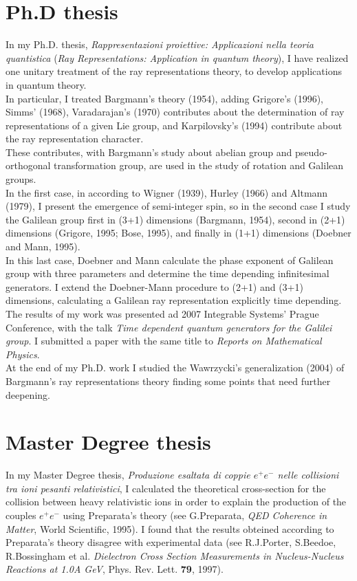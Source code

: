 \documentclass[a4paper]{article}
\begin{document}
\section{Ph.D thesis}
In my Ph.D. thesis, {\em Rappresentazioni proiettive: Applicazioni nella teoria quantistica} ({\em Ray Representations: Application in quantum theory}), I have realized one unitary treatment of the ray representations theory, to develop applications in quantum theory.\\
In particular, I treated Bargmann's theory (1954), adding Grigore's (1996), Simms' (1968), Varadarajan's (1970) contributes about the determination of ray representations of a given Lie group, and Karpilovsky's (1994) contribute about the ray representation character.\\
These contributes, with Bargmann's study about abelian group and pseudo-orthogonal transformation group, are used in the study of rotation and Galilean groups.\\
In the first case, in according to Wigner (1939), Hurley (1966) and Altmann (1979), I present the emergence of semi-integer spin, so in the second case I study the Galilean group first in (3+1) dimensions (Bargmann, 1954), second in (2+1) dimensions (Grigore, 1995; Bose, 1995), and finally in (1+1) dimensions (Doebner and Mann, 1995).\\ 
In this last case, Doebner and Mann calculate the phase exponent of Galilean group with three parameters and determine the time depending infinitesimal generators. I extend the Doebner-Mann procedure to (2+1) and (3+1) dimensions, calculating a Galilean ray representation explicitly time depending.\\
The results of my work was presented ad 2007 Integrable Systems' Prague Conference, with the talk {\em Time dependent quantum generators for the Galilei group}. I submitted a paper with the same title to {\em Reports on Mathematical Physics}.\\
At the end of my Ph.D. work I studied the Wawrzycki's generalization (2004) of Bargmann's ray representations theory finding some points that need further deepening.
%
\section{Master Degree thesis}
In my Master Degree thesis, {\em Produzione esaltata di coppie $e^+ e^-$ nelle collisioni tra ioni pesanti relativistici}, I calculated the theoretical cross-section for the collision between heavy relativistic ions in order to explain the production of the couples $e^+ e^-$ using Preparata's theory (see G.Preparata, {\em QED Coherence in Matter}, World Scientific, 1995). I found that the results obteined according to Preparata's theory disagree with experimental data (see R.J.Porter, S.Beedoe, R.Bossingham et al. {\em Dielectron Cross Section Measurements in Nucleus-Nucleus Reactions at 1.0A GeV}, Phys. Rev. Lett. {\bf 79}, 1997).
\end{document}
